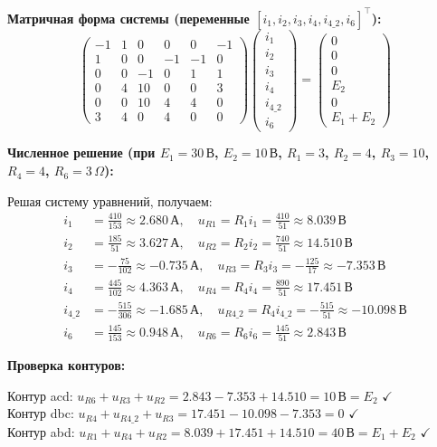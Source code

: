 \textbf{Матричная форма системы (переменные $[i_1, i_2, i_3, i_4, i_{4\_2}, i_6]^\top$):}
$$\begin{pmatrix}
-1 &  1 &  0 &  0 &  0 & -1 \\
 1 &  0 &  0 & -1 & -1 &  0 \\
 0 &  0 & -1 &  0 &  1 &  1 \\
 0 &  4 & 10 &  0 &  0 &  3 \\
 0 &  0 & 10 &  4 &  4 &  0 \\
 3 &  4 &  0 &  4 &  0 &  0
\end{pmatrix}
\begin{pmatrix}
i_1 \\
i_2 \\
i_3 \\
i_4 \\
i_{4\_2} \\
i_6
\end{pmatrix}
=
\begin{pmatrix}
0 \\
0 \\
0 \\
E_2 \\
0 \\
E_1 + E_2
\end{pmatrix}$$

\textbf{Численное решение (при $E_1=30\,\text{В}$, $E_2=10\,\text{В}$, $R_1=3$, $R_2=4$, $R_3=10$, $R_4=4$, $R_6=3\,\Omega$):}

Решая систему уравнений, получаем:
\begin{align*}
i_1 &= \frac{410}{153} \approx 2.680\,\text{А}, \quad u_{R1} = R_1 i_1 = \frac{410}{51} \approx 8.039\,\text{В} \\
i_2 &= \frac{185}{51} \approx 3.627\,\text{А}, \quad u_{R2} = R_2 i_2 = \frac{740}{51} \approx 14.510\,\text{В} \\
i_3 &= -\frac{75}{102} \approx -0.735\,\text{А}, \quad u_{R3} = R_3 i_3 = -\frac{125}{17} \approx -7.353\,\text{В} \\
i_4 &= \frac{445}{102} \approx 4.363\,\text{А}, \quad u_{R4} = R_4 i_4 = \frac{890}{51} \approx 17.451\,\text{В} \\
i_{4\_2} &= -\frac{515}{306} \approx -1.685\,\text{А}, \quad u_{R4\_2} = R_4 i_{4\_2} = -\frac{515}{51} \approx -10.098\,\text{В} \\
i_6 &= \frac{145}{153} \approx 0.948\,\text{А}, \quad u_{R6} = R_6 i_6 = \frac{145}{51} \approx 2.843\,\text{В}
\end{align*}

\textbf{Проверка контуров:}
\begin{flushleft}
Контур acd: $u_{R6} + u_{R3} + u_{R2} = 2.843 - 7.353 + 14.510 = 10\,\text{В} = E_2$ $\checkmark$ \\
Контур dbc: $u_{R4} + u_{R4\_2} + u_{R3} = 17.451 - 10.098 - 7.353 = 0$ $\checkmark$ \\
Контур abd: $u_{R1} + u_{R4} + u_{R2} = 8.039 + 17.451 + 14.510 = 40\,\text{В} = E_1 + E_2$ $\checkmark$
\end{flushleft}

